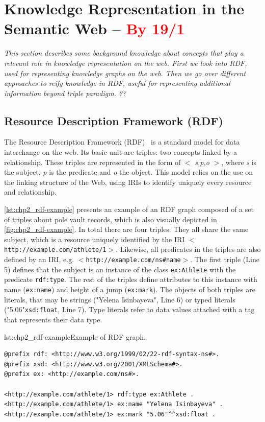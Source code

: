 \section{Knowledge Representation in the Semantic Web \textcolor{red}{-- By 19/1}}
\label{sec:chp2_semweb}

\textit{This section describes some background knowledge about concepts that play a relevant role in knowledge representation on the web. First we look into RDF, used for representing knowledge graphs on the web. Then we go over different approaches to reify knowledge in RDF, useful for representing additional information beyond triple paradigm. ??}

\subsection{Resource Description Framework (RDF)}

The Resource Description Framework (RDF)~\parencite{rdf} is a standard model for data interchange on the web. Its basic unit are triples: two concepts linked by a relationship. These triples are represented in the form of $<$ \textit{s,p,o} $>$, where \textit{s} is the subject, \textit{p} is the predicate and \textit{o} the object. This model relies on the use on the linking structure of the Web, using IRIs to identify uniquely every resource and relationship. 

\cref{lst:chp2_rdf-example} presents an example of an RDF graph composed of a set of triples about pole vault records, which is also visually depicted in \cref{fig:chp2_rdf-example}. In total there are four triples. They all share the same subject, which is a resource uniquely identified by the IRI $<$\texttt{http://example.com/athlete/1}$>$. Likewise, all predicates in the triples are also defined by an IRI, e.g. $<$\texttt{http://example.com/ns\#name}$>$. The first triple (Line 5) defines that the subject is an instance of the class \texttt{ex:Athlete} with the predicate \texttt{rdf:type}. The rest of the triples define attributes to this instance with name (\texttt{ex:name}) and height of a jump (\texttt{ex:mark}). The objects of both triples are literals, that may be strings ("Yelena Isinbayeva", Line 6) or typed literals ("5.06"\scalebox{.8}{\textsuperscript{$\wedge\wedge$}}\texttt{xsd:float}, Line 7). Type literals refer to data values attached with a tag that represents their data type.

\begin{minipage}{\textwidth}
\begin{captionedlisting}{lst:chp2_rdf-example}{Example of RDF graph.}
\centering
{\begin{lstlisting}[language=r2rml]
@prefix rdf: <http://www.w3.org/1999/02/22-rdf-syntax-ns#>.
@prefix xsd: <http://www.w3.org/2001/XMLSchema#>.
@prefix ex: <http://example.com/ns#>.

<http://example.com/athlete/1> rdf:type ex:Athlete .
<http://example.com/athlete/1> ex:name "Yelena Isinbayeva" .
<http://example.com/athlete/1> ex:mark "5.06"^^xsd:float .
\end{lstlisting}}
\end{captionedlisting}
\end{minipage}

